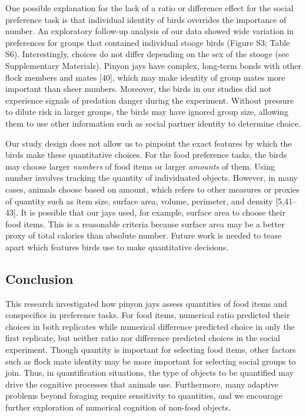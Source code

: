 \documentclass[
  ,doc,floatsintext]{apa6}
\begin{document}
One possible explanation for the lack of a ratio or difference effect for the social preference task is that individual identity of birds overrides the importance of number. An exploratory follow-up analysis of our data showed wide variation in preferences for groups that contained individual stooge birds (Figure S3; Table S6). Interestingly, choices do not differ depending on the sex of the stooge (see Supplementary Materials). Pinyon jays have complex, long-term bonds with other flock members and mates {[}40{]}, which may make identity of group mates more important than sheer numbers. Moreover, the birds in our studies did not experience signals of predation danger during the experiment. Without pressure to dilute risk in larger groups, the birds may have ignored group size, allowing them to use other information such as social partner identity to determine choice.

Our study design does not allow us to pinpoint the exact features by which the birds make these quantitative choices. For the food preference tasks, the birds may choose larger \emph{numbers} of food items or larger \emph{amounts} of them. Using number involves tracking the quantity of individuated objects. However, in many cases, animals choose based on amount, which refers to other measures or proxies of quantity such as item size, surface area, volume, perimeter, and density {[}5,41--43{]}. It is possible that our jays used, for example, surface area to choose their food items. This is a reasonable criteria because surface area may be a better proxy of total calories than absolute number. Future work is needed to tease apart which features birds use to make quantitative decisions.

\hypertarget{conclusion}{%
\subsection{Conclusion}\label{conclusion}}

This research investigated how pinyon jays assess quantities of food items and conspecifics in preference tasks. For food items, numerical ratio predicted their choices in both replicates while numerical difference predicted choice in only the first replicate, but neither ratio nor difference predicted choices in the social experiment. Though quantity is important for selecting food items, other factors such as flock mate identity may be more important for selecting social groups to join. Thus, in quantification situations, the type of objects to be quantified may drive the cognitive processes that animals use. Furthermore, many adaptive problems beyond foraging require sensitivity to quantities, and we encourage further exploration of numerical cognition of non-food objects.
\end{document}
